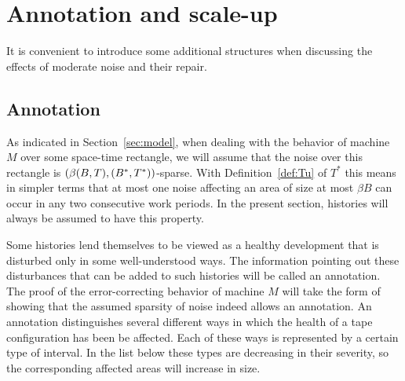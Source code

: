 \documentclass[12pt]{memoir}
\def\B{B}
\newcommand{\Tu}{T}
\begin{document}
\section{Annotation and scale-up}

It is convenient to introduce some additional structures when discussing
the effects of moderate noise and their repair.

\subsection{Annotation}\label{sec:annotation}

As indicated in Section~\ref{sec:model}, when dealing with the behavior
of machine \( M \) over some space-time rectangle, we will assume that the noise
over this rectangle is \( (\beta\pair{\B}{\Tu}, \pair{\B^{*}}{\Tu^{*}}) \)-sparse.
With Definition~\ref{def:Tu} of \( \Tu^{*} \) this means 
in simpler terms that at most one noise  affecting an
area of size at most \( \beta\B \) can occur in any two consecutive work periods.
In the present section, histories will always be assumed to have this property.


Some histories lend themselves to be viewed as a healthy development
that is disturbed only in some well-understood ways.
The information pointing out these disturbances that can be added to such histories 
will be called an annotation.
The proof of the error-correcting behavior of machine \( M \) will take the form
of showing that the assumed sparsity of noise indeed allows an annotation.
An annotation distinguishes several different ways in which the health 
of a tape configuration has been be affected.
Each of these ways is represented by a certain type of interval.
In the list below these types are decreasing in their severity, so the corresponding
affected areas will increase in size.
\end{document}
